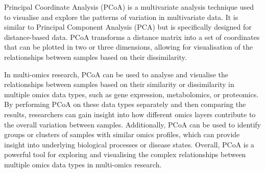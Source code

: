 \documentclass[
]{book}
\newenvironment{Shaded}{\begin{snugshade}}{\end{snugshade}}
\newcommand{\AttributeTok}[1]{\textcolor[rgb]{0.77,0.63,0.00}{#1}}
\newcommand{\CommentTok}[1]{\textcolor[rgb]{0.56,0.35,0.01}{\textit{#1}}}
\newcommand{\ConstantTok}[1]{\textcolor[rgb]{0.00,0.00,0.00}{#1}}
\newcommand{\DecValTok}[1]{\textcolor[rgb]{0.00,0.00,0.81}{#1}}
\newcommand{\FunctionTok}[1]{\textcolor[rgb]{0.00,0.00,0.00}{#1}}
\newcommand{\NormalTok}[1]{#1}
\newcommand{\OtherTok}[1]{\textcolor[rgb]{0.56,0.35,0.01}{#1}}
\newcommand{\SpecialCharTok}[1]{\textcolor[rgb]{0.00,0.00,0.00}{#1}}
\newcommand{\StringTok}[1]{\textcolor[rgb]{0.31,0.60,0.02}{#1}}
\begin{document}
Principal Coordinate Analysis (PCoA) is a multivariate analysis technique used to visualise and explore the patterns of variation in multivariate data. It is similar to Principal Component Analysis (PCA) but is specifically designed for distance-based data. PCoA transforms a distance matrix into a set of coordinates that can be plotted in two or three dimensions, allowing for visualisation of the relationships between samples based on their dissimilarity.

In multi-omics research, PCoA can be used to analyse and visualise the relationships between samples based on their similarity or dissimilarity in multiple omics data types, such as gene expression, metabolomics, or proteomics. By performing PCoA on these data types separately and then comparing the results, researchers can gain insight into how different omics layers contribute to the overall variation between samples. Additionally, PCoA can be used to identify groups or clusters of samples with similar omics profiles, which can provide insight into underlying biological processes or disease states. Overall, PCoA is a powerful tool for exploring and visualising the complex relationships between multiple omics data types in multi-omics research.

\begin{Shaded}
\end{Shaded}
\end{document}
